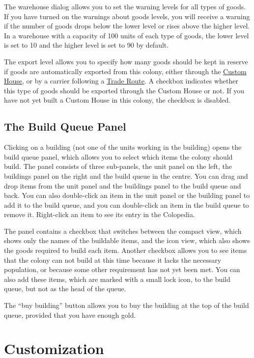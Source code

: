 \documentclass[12pt]{book}
\begin{document}
The warehouse dialog allows you to set the warning levels for all
types of goods. If you have turned on the warnings about goods levels,
you will receive a warning if the number of goods drops below the
lower level or rises above the higher level. In a warehouse with a
capacity of 100 units of each type of goods, the lower level is set to
10 and the higher level is set to 90 by default.

The export level allows you to specify how many goods should be kept
in reserve if goods are automatically exported from this colony,
either through the \hyperlink{Custom House}{Custom House}, or by a
carrier following a \hyperlink{Trade Routes}{Trade Route}. A checkbox
indicates whether this type of goods should be exported through the
Custom House or not. If you have not yet built a Custom House in this
colony, the checkbox is disabled.


\hypertarget{The Build Queue Panel}{\subsection{The Build Queue Panel}}

Clicking on a building (not one of the units working in the building)
opens the build queue panel, which allows you to select which items
the colony should build. The panel consists of three sub-panels, the
unit panel on the left, the buildings panel on the right and the build
queue in the centre. You can drag and drop items from the unit panel
and the buildings panel to the build queue and back. You can also
double-click an item in the unit panel or the building panel to add it
to the build queue, and you can double-click an item in the build
queue to remove it. Right-click an item to see its entry in the
Colopedia.

The panel contains a checkbox that switches between the compact view,
which shows only the names of the buildable items, and the icon view,
which also shows the goods required to build each item. Another
checkbox allows you to see items that the colony can not build at this
time because it lacks the necessary population, or because some other
requirement has not yet been met. You can also add these items, which
are marked with a small lock icon, to the build queue, but not as the
head of the queue.

The ``buy building'' button allows you to buy the building at the top
of the build queue, provided that you have enough gold.


\hypertarget{customization}{\section{Customization}}
\end{document}
